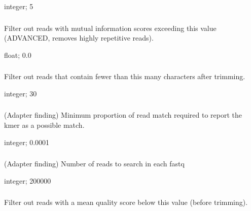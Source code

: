 \documentclass[letterpaper,10pt,english]{sphinxmanual}
\begin{document}
 integer;  5


\subsubsection{}
\label{\detokenize{prog_desc:i-filter-low-info}}
 Filter out reads with mutual information scores exceeding this value (ADVANCED, removes highly repetitive reads).

 float;  0.0


\subsubsection{}
\label{\detokenize{prog_desc:l-filter-length}}
 Filter out reads that contain fewer than this many characters after trimming.

 integer;  30


\subsubsection{}
\label{\detokenize{prog_desc:m-adapter-min-match}}
 (Adapter finding) Minimum proportion of read match required to report the kmer as a possible match.

 integer;  0.0001


\subsubsection{}
\label{\detokenize{prog_desc:n-adapter-number-of-reads}}
 (Adapter finding) Number of reads to search in each fastq

 integer;  200000


\subsubsection{}
\label{\detokenize{prog_desc:q-filter-quality}}
 Filter out reads with a mean quality score below this value (before trimming).
\end{document}
